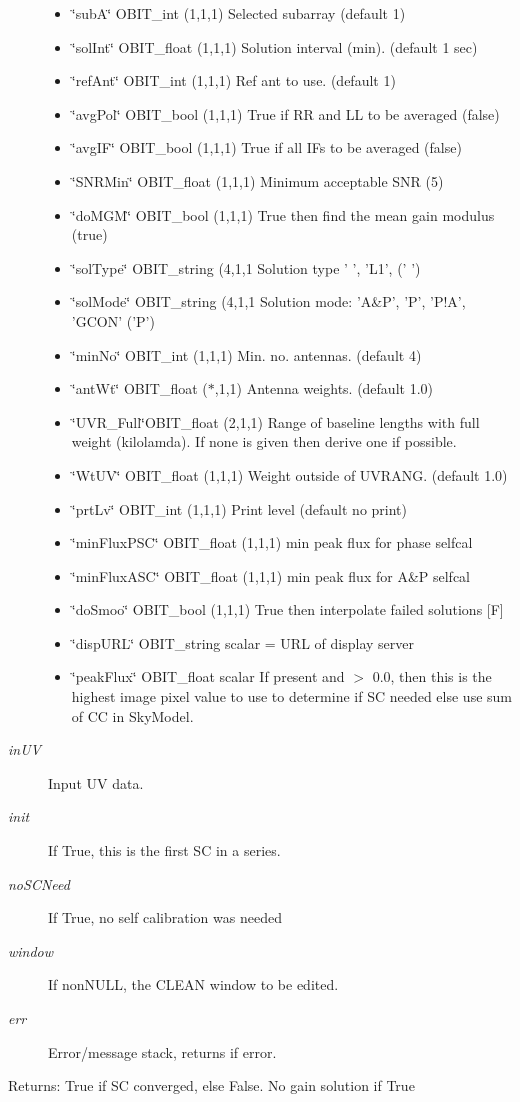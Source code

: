 \begin{Desc}
\begin{description}
\begin{itemize}
\item \char`\"{}sub\-A\char`\"{} OBIT\_\-int (1,1,1) Selected subarray (default 1) \item \char`\"{}sol\-Int\char`\"{} OBIT\_\-float (1,1,1) Solution interval (min). (default 1 sec) \item \char`\"{}ref\-Ant\char`\"{} OBIT\_\-int (1,1,1) Ref ant to use. (default 1) \item \char`\"{}avg\-Pol\char`\"{} OBIT\_\-bool (1,1,1) True if RR and LL to be averaged (false) \item \char`\"{}avg\-IF\char`\"{} OBIT\_\-bool (1,1,1) True if all IFs to be averaged (false) \item \char`\"{}SNRMin\char`\"{} OBIT\_\-float (1,1,1) Minimum acceptable SNR (5) \item \char`\"{}do\-MGM\char`\"{} OBIT\_\-bool (1,1,1) True then find the mean gain modulus (true) \item \char`\"{}sol\-Type\char`\"{} OBIT\_\-string (4,1,1 Solution type ' ', 'L1', (' ') \item \char`\"{}sol\-Mode\char`\"{} OBIT\_\-string (4,1,1 Solution mode: 'A\&P', 'P', 'P!A', 'GCON' ('P') \item \char`\"{}min\-No\char`\"{} OBIT\_\-int (1,1,1) Min. no. antennas. (default 4) \item \char`\"{}ant\-Wt\char`\"{} OBIT\_\-float ($\ast$,1,1) Antenna weights. (default 1.0) \item \char`\"{}UVR\_\-Full\char`\"{}OBIT\_\-float (2,1,1) Range of baseline lengths with full weight (kilolamda). If none is given then derive one if possible. \item \char`\"{}Wt\-UV\char`\"{} OBIT\_\-float (1,1,1) Weight outside of UVRANG. (default 1.0) \item \char`\"{}prt\-Lv\char`\"{} OBIT\_\-int (1,1,1) Print level (default no print) \item \char`\"{}min\-Flux\-PSC\char`\"{} OBIT\_\-float (1,1,1) min peak flux for phase selfcal \item \char`\"{}min\-Flux\-ASC\char`\"{} OBIT\_\-float (1,1,1) min peak flux for A\&P selfcal \item \char`\"{}do\-Smoo\char`\"{} OBIT\_\-bool (1,1,1) True then interpolate failed solutions [F] \item \char`\"{}disp\-URL\char`\"{} OBIT\_\-string scalar = URL of display server \item \char`\"{}peak\-Flux\char`\"{} OBIT\_\-float scalar If present and $>$ 0.0, then this is the highest image pixel value to use to determine if SC needed else use sum of CC in Sky\-Model. \end{itemize}
\item[{\em in\-UV}]Input UV data. \item[{\em init}]If True, this is the first SC in a series. \item[{\em no\-SCNeed}]If True, no self calibration was needed \item[{\em window}]If non\-NULL, the CLEAN window to be edited. \item[{\em err}]Error/message stack, returns if error. \end{description}
\end{Desc}
\begin{Desc}
\item[Returns:]True if SC converged, else False. No gain solution if True \end{Desc}
